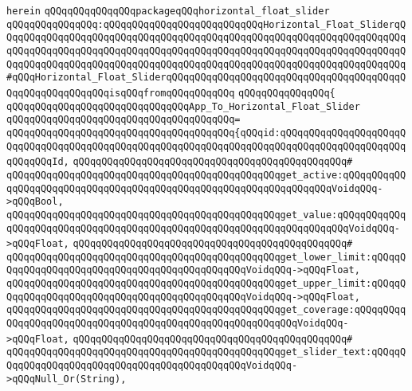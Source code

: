 \verb|herein|\newline
\newline
\verb|qQQqqQQqqQQqqQQqpackageqQQqhorizontal_float_slider|\newline
\verb|qQQqqQQqqQQqqQQq:qQQqqQQqqQQqqQQqqQQqqQQqqQQqHorizontal_Float_SliderqQQqqQQqqQQqqQQqqQQqqQQqqQQqqQQqqQQqqQQqqQQqqQQqqQQqqQQqqQQqqQQqqQQqqQQqqQQqqQQqqQQqqQQqqQQqqQQqqQQqqQQqqQQqqQQqqQQqqQQqqQQqqQQqqQQqqQQqqQQqqQQqqQQqqQQqqQQqqQQqqQQqqQQqqQQqqQQqqQQqqQQqqQQqqQQqqQQqqQQqqQQqqQQqqQQq#qQQqHorizontal_Float_SliderqQQqqQQqqQQqqQQqqQQqqQQqqQQqqQQqqQQqqQQqqQQqqQQqqQQqqQQqqQQqisqQQqfromqQQqqQQqqQQq|\newline
\verb|qQQqqQQqqQQqqQQq{|\newline
\verb|qQQqqQQqqQQqqQQqqQQqqQQqqQQqqQQqApp_To_Horizontal_Float_Slider|\newline
\verb|qQQqqQQqqQQqqQQqqQQqqQQqqQQqqQQqqQQqqQQq=|\newline
\verb|qQQqqQQqqQQqqQQqqQQqqQQqqQQqqQQqqQQqqQQq{qQQqid:qQQqqQQqqQQqqQQqqQQqqQQqqQQqqQQqqQQqqQQqqQQqqQQqqQQqqQQqqQQqqQQqqQQqqQQqqQQqqQQqqQQqqQQqqQQqqQQqqQQqId,|\newline
\verb|qQQqqQQqqQQqqQQqqQQqqQQqqQQqqQQqqQQqqQQqqQQqqQQq#|\newline
\verb|qQQqqQQqqQQqqQQqqQQqqQQqqQQqqQQqqQQqqQQqqQQqqQQqget_active:qQQqqQQqqQQqqQQqqQQqqQQqqQQqqQQqqQQqqQQqqQQqqQQqqQQqqQQqqQQqqQQqqQQqVoidqQQq->qQQqBool,|\newline
\verb|qQQqqQQqqQQqqQQqqQQqqQQqqQQqqQQqqQQqqQQqqQQqqQQqget_value:qQQqqQQqqQQqqQQqqQQqqQQqqQQqqQQqqQQqqQQqqQQqqQQqqQQqqQQqqQQqqQQqqQQqqQQqVoidqQQq->qQQqFloat,|\newline
\verb|qQQqqQQqqQQqqQQqqQQqqQQqqQQqqQQqqQQqqQQqqQQqqQQq#|\newline
\verb|qQQqqQQqqQQqqQQqqQQqqQQqqQQqqQQqqQQqqQQqqQQqqQQqget_lower_limit:qQQqqQQqqQQqqQQqqQQqqQQqqQQqqQQqqQQqqQQqqQQqqQQqVoidqQQq->qQQqFloat,|\newline
\verb|qQQqqQQqqQQqqQQqqQQqqQQqqQQqqQQqqQQqqQQqqQQqqQQqget_upper_limit:qQQqqQQqqQQqqQQqqQQqqQQqqQQqqQQqqQQqqQQqqQQqqQQqVoidqQQq->qQQqFloat,|\newline
\verb|qQQqqQQqqQQqqQQqqQQqqQQqqQQqqQQqqQQqqQQqqQQqqQQqget_coverage:qQQqqQQqqQQqqQQqqQQqqQQqqQQqqQQqqQQqqQQqqQQqqQQqqQQqqQQqqQQqVoidqQQq->qQQqFloat,|\newline
\verb|qQQqqQQqqQQqqQQqqQQqqQQqqQQqqQQqqQQqqQQqqQQqqQQq#|\newline
\verb|qQQqqQQqqQQqqQQqqQQqqQQqqQQqqQQqqQQqqQQqqQQqqQQqget_slider_text:qQQqqQQqqQQqqQQqqQQqqQQqqQQqqQQqqQQqqQQqqQQqqQQqVoidqQQq->qQQqNull_Or(String),|\newline
